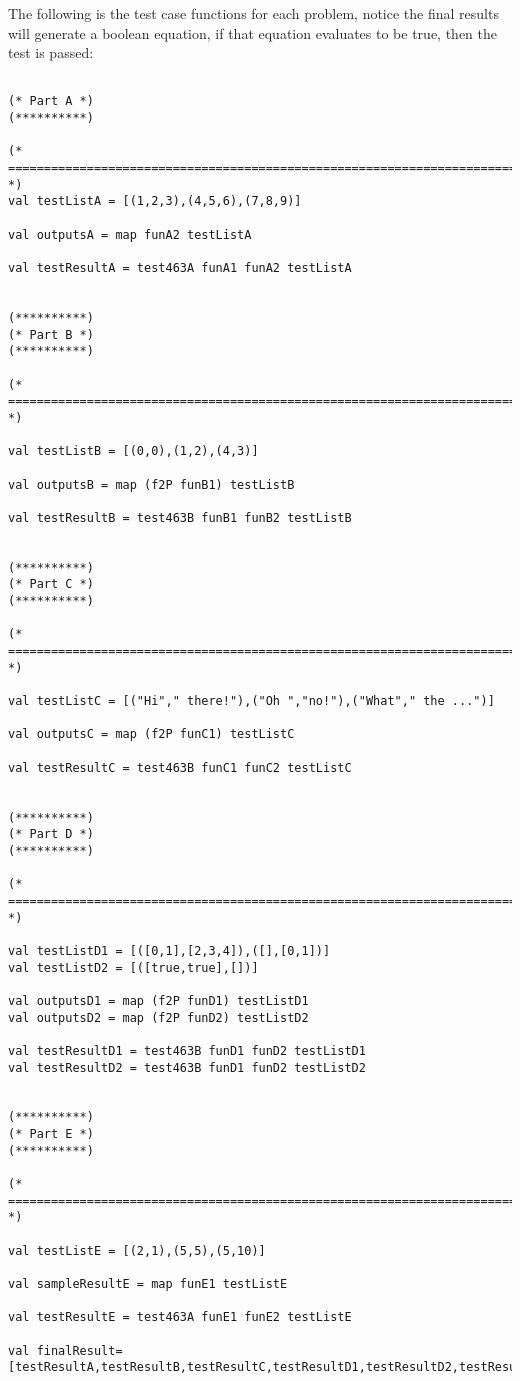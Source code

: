 \documentclass{report}
\begin{document}
The following is the test case functions for each problem, notice the final results will generate a boolean equation, if that equation evaluates to be true, then the test is passed:
\begin{lstlisting}[frame = TB]

(* Part A *)
(**********)

(* ========================================================================== *)
val testListA = [(1,2,3),(4,5,6),(7,8,9)]

val outputsA = map funA2 testListA

val testResultA = test463A funA1 funA2 testListA


(**********)
(* Part B *)
(**********)

(* ========================================================================== *)

val testListB = [(0,0),(1,2),(4,3)]

val outputsB = map (f2P funB1) testListB

val testResultB = test463B funB1 funB2 testListB


(**********)
(* Part C *)
(**********)

(* ========================================================================== *)

val testListC = [("Hi"," there!"),("Oh ","no!"),("What"," the ...")]

val outputsC = map (f2P funC1) testListC

val testResultC = test463B funC1 funC2 testListC


(**********)
(* Part D *)
(**********)

(* ========================================================================== *)

val testListD1 = [([0,1],[2,3,4]),([],[0,1])]
val testListD2 = [([true,true],[])]

val outputsD1 = map (f2P funD1) testListD1
val outputsD2 = map (f2P funD2) testListD2

val testResultD1 = test463B funD1 funD2 testListD1
val testResultD2 = test463B funD1 funD2 testListD2


(**********)
(* Part E *)
(**********)

(* ========================================================================== *)

val testListE = [(2,1),(5,5),(5,10)]

val sampleResultE = map funE1 testListE

val testResultE = test463A funE1 funE2 testListE

val finalResult= [testResultA,testResultB,testResultC,testResultD1,testResultD2,testResultE]
\end{lstlisting}
\end{document}
